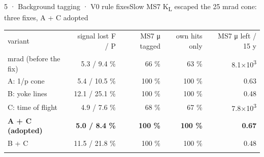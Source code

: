 \begin{btframe}{5 · Background tagging · V0 rule fixes}{Slow MS7 K\textsubscript{L} escaped the 25 mrad cone: three fixes, A + C adopted}
\begin{minipage}[t]{\dimexpr(0.2500\linewidth-0.2500\dimexpr14.22pt\relax)}
\end{minipage}\par
\vspace{2.46pt}
{\fontsize{4.37pt}{5.68pt}\selectfont\setlength{\tabcolsep}{3.06pt}\renewcommand{\arraystretch}{1.42}
\begin{tabularx}{\linewidth}{>{\raggedright\arraybackslash}Xrrrr}
\textcolor{muted}{variant} & \textcolor{muted}{signal lost F / P} & \textcolor{muted}{MS7 μ tagged} & \textcolor{muted}{own hits only} & \textcolor{muted}{MS7 μ left / 15 y} \\\headrule
25 mrad (before the fix) & 5.3 / 9.4 \% & 66 \% & 63 \% & 8.1×10\textsuperscript{3} \\\rowrule
A: 1/p cone & 5.4 / 10.5 \% & 100 \% & 100 \% & 0.63 \\\rowrule
B: yoke lines & 12.1 / 25.1 \% & 100 \% & 100 \% & 0.48 \\\rowrule
C: time of flight & 4.9 / 7.6 \% & 68 \% & 67 \% & 7.8×10\textsuperscript{3} \\\rowrule
\rowcolor{tint}\bfseries A + C (adopted) & \bfseries 5.0 / 8.4 \% & \bfseries 100 \% & \bfseries 100 \% & \bfseries 0.67 \\\rowrule
B + C & 11.5 / 21.8 \% & 100 \% & 100 \% & 0.48 \\\rowrule
\end{tabularx}\par}
\end{btframe}

% 

